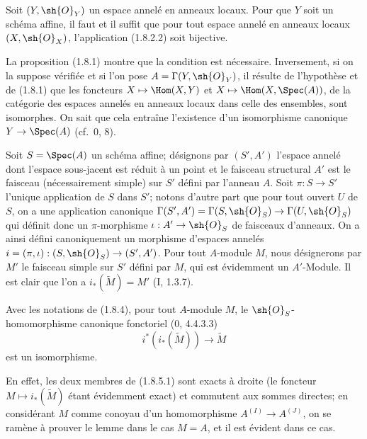 \begin{corollary}[1.8.3]
\label{ega2:addendum:I.1.8.3-fr}
Soit $(Y,\sh{O}_Y)$ un espace annelé en anneaux locaux. Pour que $Y$
soit un schéma affine, il faut et il suffit que pour tout espace annelé
en anneaux locaux $(X,\sh{O}_X)$, l'application (1.8.2.2) soit
bijective.
\end{corollary}

La proposition (1.8.1) montre que la condition est nécessaire.
Inversement, si on la suppose vérifiée et si l'on pose
$A=\Gamma(Y,\sh{O}_Y)$, il résulte de l'hypothèse et de (1.8.1) que les
foncteurs $X\mapsto\Hom(X,Y)$ et
$X\mapsto\Hom(X,\Spec(A))$, de la catégorie des espaces annelés en
anneaux locaux dans celle des ensembles, sont isomorphes. On sait que
cela entraîne l'existence d'un isomorphisme canonique
$Y\to\Spec(A)$ (cf.~0, 8).

\begin{env}[1.8.4]
\label{ega2:addendum:I.1.8.4-fr}
Soit $S=\Spec(A)$ un schéma affine; désignons par $(S',A')$ l'espace
annelé dont l'espace sous-jacent est réduit à un point et le faisceau
structural $A'$ est le faisceau (nécessairement simple) sur $S'$ défini
par l'anneau $A$. Soit $\pi:S\to S'$ l'unique application de $S$ dans
$S'$; notons d'autre part que pour tout ouvert $U$ de $S$, on a une
application canonique
$\Gamma(S',A')=\Gamma(S,\sh{O}_S)\to\Gamma(U,\sh{O}_S)$ qui définit
donc un $\pi$-morphisme $\iota:A'\to\sh{O}_S$ de faisceaux d'anneaux.
On a ainsi défini canoniquement un morphisme d'espaces annelés
$i=(\pi,\iota):(S,\sh{O}_S)\to(S',A')$. Pour tout $A$-module $M$, nous
désignerons par $M'$ le faisceau simple sur $S'$ défini par $M$, qui
est évidemment un $A'$-Module. Il est clair que l'on a
$i_*(\widetilde M)=M'$ (I, 1.3.7).
\end{env}

\begin{lemma}[1.8.5]
\label{ega2:addendum:I.1.8.5-fr}
Avec les notations de (1.8.4), pour tout $A$-module $M$, le
$\sh{O}_S$-homomorphisme canonique fonctoriel (0, 4.4.3.3)
\begin{equation}
\label{ega2:addendum:I.1.8.5.1-fr}
  i^*(i_*(\widetilde M))\to\widetilde M
\tag{1.8.5.1}
\end{equation}
est un isomorphisme.
\end{lemma}

En effet, les deux membres de (1.8.5.1) sont exacts à droite (le
foncteur $M\mapsto i_*(\widetilde M)$ étant évidemment exact) et
commutent aux sommes directes; en considérant $M$ comme conoyau d'un
homomorphisme $A^{(I)}\to A^{(J)}$, on se ramène à prouver le lemme
dans le cas $M=A$, et il est évident dans ce cas.


